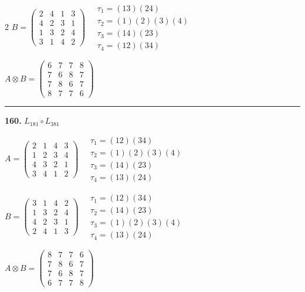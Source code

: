 \begin{multicols}{2}
$B = \begin{pmatrix} 2 & 4 & 1 & 3 \\ 4 & 2 & 3 & 1 \\ 1 & 3 & 2 & 4 \\ 3 & 1 & 4 & 2 \end{pmatrix} \quad \begin{matrix} \tau_{1}=(1 3)(2 4) \\ \tau_{2}=(1)(2)(3)(4) \\ \tau_{3}=(1 4)(2 3) \\ \tau_{4}=(1 2)(3 4) \end{matrix}$

$A \otimes B = \begin{pmatrix} 6 & 7 & 7 & 8 \\ 7 & 6 & 8 & 7 \\ 7 & 8 & 6 & 7 \\ 8 & 7 & 7 & 6 \end{pmatrix}$

\vspace{0.3em}
\hrule
\vspace{0.3em}

\noindent\textbf{160.} $L_{181} \circ L_{381}$

$A = \begin{pmatrix} 2 & 1 & 4 & 3 \\ 1 & 2 & 3 & 4 \\ 4 & 3 & 2 & 1 \\ 3 & 4 & 1 & 2 \end{pmatrix} \quad \begin{matrix} \tau_{1}=(1 2)(3 4) \\ \tau_{2}=(1)(2)(3)(4) \\ \tau_{3}=(1 4)(2 3) \\ \tau_{4}=(1 3)(2 4) \end{matrix}$

$B = \begin{pmatrix} 3 & 1 & 4 & 2 \\ 1 & 3 & 2 & 4 \\ 4 & 2 & 3 & 1 \\ 2 & 4 & 1 & 3 \end{pmatrix} \quad \begin{matrix} \tau_{1}=(1 2)(3 4) \\ \tau_{2}=(1 4)(2 3) \\ \tau_{3}=(1)(2)(3)(4) \\ \tau_{4}=(1 3)(2 4) \end{matrix}$

$A \otimes B = \begin{pmatrix} 8 & 7 & 7 & 6 \\ 7 & 8 & 6 & 7 \\ 7 & 6 & 8 & 7 \\ 6 & 7 & 7 & 8 \end{pmatrix}$


\end{multicols}
